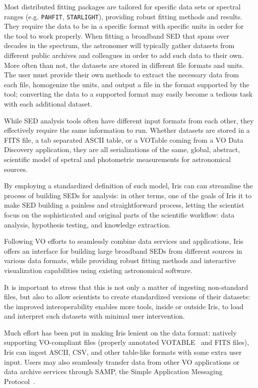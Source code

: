\documentclass[final,5p]{elsarticle}
\begin{document}
Most distributed fitting packages are tailored for specific data sets or spectral ranges (e.g. \texttt{PAHFIT}, \texttt{STAR\-LIGHT}), providing robust fitting methods and results. They require the data to be in a specific format with specific units in order for the tool to work properly. When fitting a broadband SED that spans over decades in the spectrum, the astronomer will typically gather datasets from different public archives and colleagues in order to add such data to their own. More often than not, the datasets are stored in different file formats and units. 
The user must provide their own methods to extract the necessary data from each file, homogenize the units, and output a file in the format supported by the tool; converting the data to a supported format may easily become a tedious task with each additional dataset.

While SED analysis tools often have different input formats from each other, they effectively require the same information to run. Whether datasets are stored in a FITS file, a tab separated ASCII table, or a VOTable coming from a VO Data Discovery application, they are all serializations of the same, global, abstract, scientific model of spetral and photometric measurements for astronomical sources.

By employing a standardized definition of such model, Iris can can streamline the process of building SEDs for analysis: in other terms, one of the goals of Iris it to make SED building a painless and straightforward process, letting the scientist focus on the sophisticated and original parts of the scientific workflow: data analysis, hypothesis testing, and knowledge extraction.

Following VO efforts to seamlessly combine data services and applications, Iris offers an interface for building large broadband SEDs from different sources in various data formats, while providing robust fitting methods and interactive visualization capabilities using existing astronomical software.

It is important to stress that this is not only a matter of ingesting non-standard files, but also to allow scientists to create standardized versions of their datasets: the improved interoperability enables more tools, inside or outside Iris, to load and interpret such datasets with minimal user intervention.

Much effort has been put in making Iris lenient on the data format: natively supporting VO-compliant files (properly annotated VOTABLE~\citep{2011arXiv1110.0524O} and FITS files), Iris can ingest ASCII, CSV, and other table-like formats with some extra user input. Users may also seamlessly transfer data from other VO applications or data archive services through SAMP, the Simple Application Messaging Protocol~\citep{2011arXiv1110.0528T}.
\end{document}
